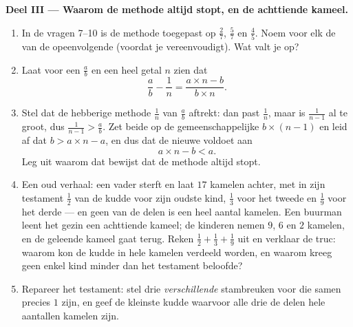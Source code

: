 \begin{problem}
\medskip
\noindent\textbf{Deel III --- Waarom de methode altijd stopt, en de achttiende
kameel.}
\begin{enumerate}[resume]
  \item In de vragen 7--10 is de methode toegepast op $\frac27$, $\frac57$ en
        $\frac45$. Noem voor elk de  van de opeenvolgende  (voordat je
        vereenvoudigt). Wat valt je op?
  \item Laat voor een  $\frac ab$ en een heel getal $n$ zien dat
        \[
        \frac{a}{b} - \frac{1}{n}
        = \frac{a \times n - b}{b \times n} .
        \]
  \item Stel dat de hebberige methode $\frac1n$ van $\frac ab$ aftrekt: dan past
        $\frac1n$, maar is $\frac{1}{n-1}$ al te groot, dus
        $\frac{1}{n-1} > \frac ab$. Zet beide op de gemeenschappelijke 
        $b \times (n - 1)$ en leid af dat $b > a \times n - a$, en dus dat de nieuwe
         voldoet aan
        \[
        a \times n - b < a .
        \]
        Leg uit waarom dat bewijst dat de methode altijd stopt.
  \item Een oud verhaal: een vader sterft en laat $17$ kamelen achter, met in zijn
        testament $\frac12$ van de kudde voor zijn oudste kind, $\frac13$ voor het
        tweede en $\frac19$ voor het derde --- en geen van de delen is een heel aantal
        kamelen. Een buurman leent het gezin een achttiende kameel; de kinderen nemen
        $9$, $6$ en $2$ kamelen, en de geleende kameel gaat terug. Reken
        $\frac12 + \frac13 + \frac19$ uit en verklaar de truc: waarom kon de kudde in
        hele kamelen verdeeld worden, en waarom kreeg geen enkel kind minder dan het
        testament beloofde?
  \item Repareer het testament: stel drie \emph{verschillende} stambreuken voor die
        samen precies $1$ zijn, en geef de kleinste kudde waarvoor alle drie de delen
        hele aantallen kamelen zijn.
\end{enumerate}
\end{problem}

